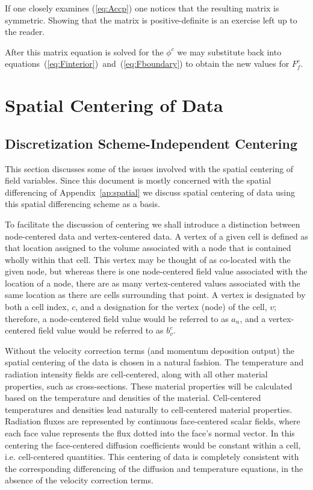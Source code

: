 \documentclass[12pt]{article}
\begin{document}
If one closely examines (\ref{eq:Accp}) one notices that the resulting
matrix is symmetric.  Showing that the matrix is positive-definite is
an exercise left up to the reader.

After this matrix equation is solved for the $\phi^{c}$ we may substitute
back into equations~(\ref{eq:Finterior})~and~(\ref{eq:Fboundary})
to obtain the new values for $F^{c}_{f}$.

\section{Spatial Centering of Data}

\subsection{Discretization Scheme-Independent Centering}

This section discusses some of the issues involved with the spatial
centering of field variables.
Since this document is mostly concerned with the spatial differencing of
Appendix~\ref{ap:spatial} we discuss spatial centering of data using
this spatial differencing scheme as a basis.

To facilitate the discussion of centering we shall introduce a distinction
between node-centered data and vertex-centered data.
A vertex of a given cell
is defined as that location assigned to the volume associated with
a node that is contained wholly within that cell.
This vertex may be thought of as co-located with the given node, but
whereas there is one node-centered field
value associated with the location of a node, there are as
many vertex-centered values associated with the same location as
there are cells surrounding that point.
A vertex is designated by both a cell index, $c$, and a designation
for the vertex (node) of the cell, $v$; therefore, a node-centered field value
would be referred to as $a_{n}$, and a vertex-centered field value
would be referred to as $b^{c}_{v}$.

Without the velocity correction terms (and momentum deposition output)
the spatial centering of the data is chosen in a natural fashion.
The temperature and radiation intensity fields are cell-centered,
along with all other material properties, such as cross-sections.
These material properties will be calculated based on the temperature
and densities of the material.
Cell-centered temperatures and densities lead naturally to cell-centered
material properties.
Radiation fluxes are represented by continuous face-centered scalar fields,
where each face value represents the flux dotted into the face's normal
vector.
In this centering the face-centered diffusion coefficients would be constant
within a cell, i.e. cell-centered quantities.
This centering of data is completely consistent with the
corresponding differencing of the diffusion and temperature equations,
in the absence of the velocity correction terms.
\end{document}
